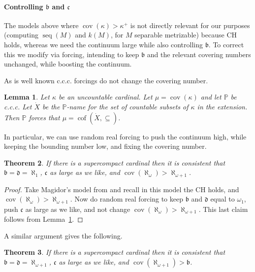 \documentclass{article}
\newtheorem{thm}{Theorem}[section]
\newtheorem{lem}[thm]{Lemma}
\DeclareMathOperator{\cof}{cof}
\begin{document}
\paragraph{Controlling $\mathfrak{b}$ and $\mathfrak{c}$}
The models above where $\mathop{cov}(\kappa) > \kappa^+$ is not directly relevant for our purposes (computing $\mathop{seq}(M)$ and $k(M)$, for $M$ separable metrizable) because \textsc{CH} holds, whereas we need the continuum large while also controlling $\mathfrak{b}$. 
To correct this we modify  via forcing, intending to keep $\mathfrak{b}$ and the relevant covering numbers unchanged, while boosting the continuum.


As is well known c.c.c. forcings do not change the covering number. 
\begin{lem}\label{lem:cccPreservesCapturing}
    Let $\kappa$ be an uncountable cardinal.
        Let $\mu=\mathop{cov}(\kappa)$ and let $\mathbb{P}$ be c.c.c. Let $\dot{X}$ be the $\mathbb{P}$-name for the set of countable subsets of $\kappa$ in the extension. Then $\mathbb{P}$ forces that $\mu=\cof(\dot{X},\subseteq)$.
\end{lem}

In particular, we can use random real forcing to push the continuum high, while keeping the bounding number low, and fixing the covering number. 
\begin{thm}\label{th:small_b_big_sam}
    If there is a supercompact cardinal then it is consistent that $\mathfrak{b}=\mathfrak{d}=\aleph_1$, $\mathfrak{c}$ as large as we like, and $\mathop{cov}(\aleph_\omega)>\aleph_{\omega+1}$.
\end{thm}
\begin{proof}
    Take Magidor's model from \cite{Magidor} and recall in this model the \textsc{CH} holds, and $\mathop{cov}(\aleph_\omega)>\aleph_{\omega+1}$.
        Now do random real forcing to keep $\mathfrak{b}$ and $\mathfrak{d}$ equal to $\omega_1$, push $\mathfrak{c}$ as large as we like, and not change $\mathop{cov}(\aleph_\omega)>\aleph_{\omega+1}$. This last claim follows from Lemma~\ref{lem:cccPreservesCapturing}.
\end{proof}

A similar argument gives the following.
\begin{thm}\label{th:sam_of_b}
    If there is a supercompact cardinal then it is consistent that $\mathfrak{b}=\mathfrak{d}=\aleph_{\omega+1}$, $\mathfrak{c}$ as large as we like, and $\mathop{cov}(\aleph_{\omega+1})>\mathfrak{b}$.
\end{thm}
\end{document}
